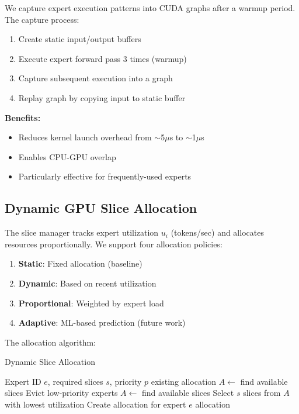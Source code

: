 \documentclass{article}
\begin{document}
We capture expert execution patterns into CUDA graphs after a warmup period. The capture process:

\begin{enumerate}
    \item Create static input/output buffers
    \item Execute expert forward pass 3 times (warmup)
    \item Capture subsequent execution into a graph
    \item Replay graph by copying input to static buffer
\end{enumerate}

\textbf{Benefits:}
\begin{itemize}
    \item Reduces kernel launch overhead from $\sim$5$\mu$s to $\sim$1$\mu$s
    \item Enables CPU-GPU overlap
    \item Particularly effective for frequently-used experts
\end{itemize}

\subsection{Dynamic GPU Slice Allocation}

The slice manager tracks expert utilization $u_i$ (tokens/sec) and allocates resources proportionally. We support four allocation policies:

\begin{enumerate}
    \item \textbf{Static}: Fixed allocation (baseline)
    \item \textbf{Dynamic}: Based on recent utilization
    \item \textbf{Proportional}: Weighted by expert load
    \item \textbf{Adaptive}: ML-based prediction (future work)
\end{enumerate}

The allocation algorithm:

\begin{algorithm}
\caption{Dynamic Slice Allocation}
\begin{algorithmic}[1]
\REQUIRE Expert ID $e$, required slices $s$, priority $p$
    \RETURN existing allocation
\ENDIF
\STATE $A \gets$ find available slices
    \STATE Evict low-priority experts
    \STATE $A \gets$ find available slices
\ENDIF
\STATE Select $s$ slices from $A$ with lowest utilization
\STATE Create allocation for expert $e$
\RETURN allocation
\end{algorithmic}
\end{algorithm}
\end{document}
